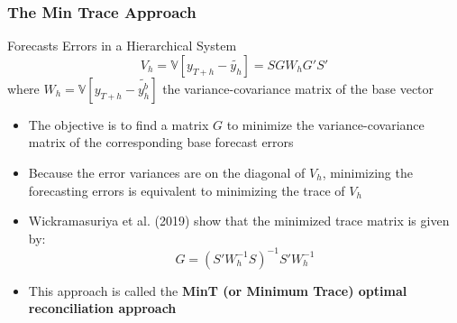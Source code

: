 \documentclass{beamer}
\begin{document}
 \begin{frame}
   \frametitle{The Min Trace Approach}
   \begin{block}{Forecasts Errors in a Hierarchical System}
     \begin{equation*}
       V_h = \mathbb{V}[y_{T+h} - \tilde{y_h}] = SGW_hG'S'
     \end{equation*}
   where $W_h = \mathbb{V}[y_{T+h} - \tilde{y^b_h}]$ the variance-covariance matrix of the base vector
 \end{block}
\bigskip

\begin{itemize}
  \item The objective is to find a matrix $G$ to minimize the variance-covariance matrix of the corresponding base forecast errors
  \item Because the error variances are on the diagonal of $V_h$, minimizing the forecasting errors is equivalent to minimizing the trace of $V_h$
  \item Wickramasuriya et al. (2019) show that the minimized trace matrix is given by:
    \begin{equation*}
      G = (S'W^{-1}_hS)^{-1}S'W_h^{-1}
    \end{equation*}
  \item This approach is called the \textbf{MinT (or Minimum Trace) optimal reconciliation approach}
    
\end{itemize} 
\end{frame}

 
  

\end{document}
